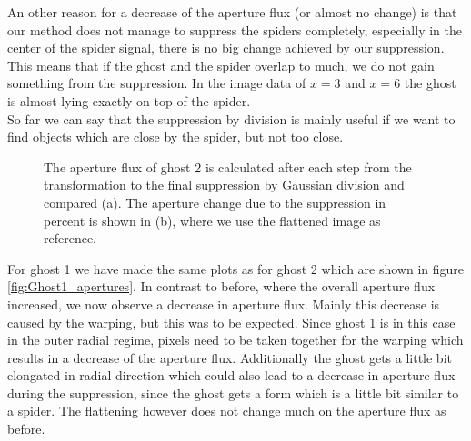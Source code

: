 An other reason for a decrease of the aperture flux (or almost no change) is that our method does not manage to suppress the spiders completely, especially in the center of the spider signal, there is no big change achieved by our suppression. This means that if the ghost and the spider overlap to much, we do not gain something from the suppression. In the image data of $x=3$ and $x=6$ the ghost is almost lying exactly on top of the spider.\\
So far we can say that the suppression by division is mainly useful if we want to find objects which are close by the spider, but not too close. \\
\begin{figure}[H]
	\centering
\caption{The aperture flux of ghost 2 is calculated after each step from the transformation to the final suppression by Gaussian division and compared (a). The aperture change due to the suppression in percent is shown in (b), where we use the flattened image as reference.}
\label{fig:Ghost2_apertures}
\end{figure}
For ghost 1 we have made the same plots as for ghost 2 which are shown in figure \ref{fig:Ghost1_apertures}. In contrast to before, where the overall aperture flux increased, we now observe a decrease in aperture flux. Mainly this decrease is caused by the warping, but this was to be expected. Since ghost 1 is in this case in the outer radial regime, pixels need to be taken together for the warping which results in a decrease of the aperture flux. Additionally the ghost gets a little bit elongated in radial direction which could also lead to a decrease in aperture flux during the suppression, since the ghost gets a form which is a little bit similar to a spider. The flattening however does not change much on the aperture flux as before.\\
